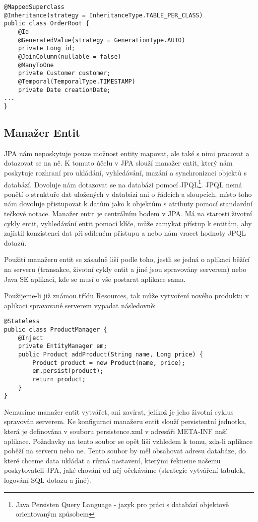 \documentclass[122pt,oneside]{fithesis}
\begin{document}
\begin{lstlisting}
@MappedSuperclass
@Inheritance(strategy = InheritanceType.TABLE_PER_CLASS)
public class OrderRoot {
	@Id
	@GeneratedValue(strategy = GenerationType.AUTO)
	private Long id;
	@JoinColumn(nullable = false)
	@ManyToOne
	private Customer customer;
	@Temporal(TemporalType.TIMESTAMP)
	private Date creationDate;
...
}
\end{lstlisting}

\subsection{Manažer Entit}

JPA nám neposkytuje pouze možnost entity mapovat, ale také s nimi pracovat a dotazovat se na ně. K tomuto účelu v JPA slouží manažer entit, který nám poskytuje rozhraní pro ukládání, vyhledávání, mazání a synchronizaci objektů s databází. Dovoluje nám dotazovat se na databázi pomocí JPQL\footnote[1]{Java Persisten Query Language - jazyk pro práci s databází objektově orientovaným způsobem}. JPQL nemá ponětí o struktuře dat uložených v databázi ani o řádcích a sloupcích, místo toho nám dovoluje přistupovat k datům jako k objektům s atributy pomocí standardní tečkové notace. Manažer entit je centrálním bodem v JPA. Má na starosti životní cykly entit, vyhledávání entit pomocí klíče, může zamykat přístup k entitám, aby zajistil konzistenci dat při sdíleném přístupu a nebo nám vracet hodnoty JPQL dotazů.

Použití manažeru entit se zásadně liší podle toho, jestli se jedná o aplikaci běžící na serveru (transakce, životní cykly entit a jiné jsou spravovány serverem) nebo Java SE aplikaci, kde se musí o vše postarat aplikace sama.

Použijeme-li již známou třídu Resources, tak může vytvoření nového produktu v aplikaci spravované serverem vypadat následovně:

\begin{lstlisting}
@Stateless
public class ProductManager {
	@Inject
	private EntityManager em;
	public Product addProduct(String name, Long price) {
		Product product = new Product(name, price);
		em.persist(product);
		return product;
	}
}
\end{lstlisting}

Nemusíme manažer entit vytvářet, ani zavírat, jelikož je jeho životní cyklus spravován serverem. Ke konfiguraci manažeru entit slouží persistentní jednotka, která je definována v souboru persistence.xml v adresáři META-INF naší aplikace. Požadavky na tento soubor se opět liší vzhledem k tomu, zda-li aplikace poběží na serveru nebo ne. Tento soubor by měl obsahovat adresu databáze, do které chceme data ukládat a různá nastavení, kterými řekneme našemu poskytovateli JPA, jaké chování od něj očekáváme (strategie vytváření tabulek, logování SQL dotazu a jiné).
\end{document}
